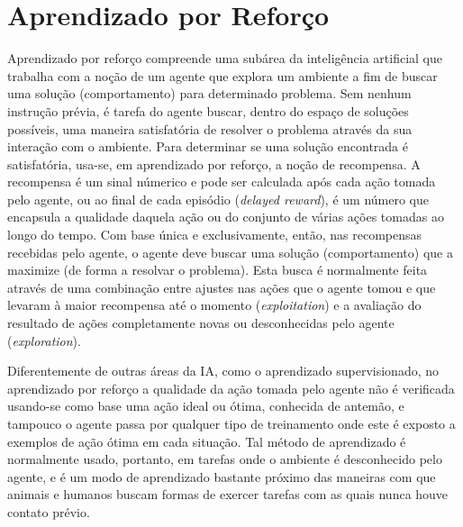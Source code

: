 \documentclass[cic,tc]{iiufrgs}
\begin{document}
%

\section{Aprendizado por Reforço}

Aprendizado por reforço compreende uma subárea da inteligência artificial que trabalha com a noção de um agente que explora um ambiente
a fim de buscar uma solução (comportamento) para determinado problema. Sem nenhum instrução prévia, é tarefa do agente buscar, dentro do espaço
de soluções possíveis, uma maneira satisfatória de resolver o problema através da sua interação com o ambiente.
Para determinar se uma solução encontrada é satisfatória, usa-se, em aprendizado por reforço, a noção de recompensa. A recompensa é um sinal númerico e pode ser calculada após cada ação tomada pelo agente, ou ao final de cada episódio (\textit{delayed reward}), é um número que encapsula a
qualidade daquela ação ou do conjunto de várias ações tomadas ao longo do tempo. Com base única e exclusivamente, então, nas recompensas recebidas pelo agente,
o agente deve buscar uma solução (comportamento) que a maximize (de forma a resolvar o problema). Esta busca  é normalmente feita através
de uma combinação entre ajustes nas ações que o agente tomou e que levaram à maior recompensa até o momento (\textit{exploitation}) e a avaliação do resultado de ações completamente
novas ou desconhecidas pelo agente (\textit{exploration}).


Diferentemente de outras áreas da IA, como o aprendizado supervisionado, no aprendizado por reforço a qualidade da ação tomada pelo agente não
é verificada usando-se como base uma ação ideal ou ótima,  conhecida de antemão, e tampouco o agente passa por qualquer tipo de treinamento onde este é exposto a
exemplos de ação ótima em cada situação. Tal método de aprendizado é normalmente usado, portanto, em tarefas onde o ambiente é desconhecido
pelo agente, e é um modo de aprendizado bastante próximo das maneiras com que
animais e humanos buscam formas de exercer tarefas com as quais nunca houve contato prévio.
\end{document}

